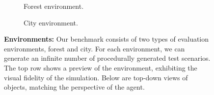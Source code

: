 \begin{figure}
    \centering
    \begin{subfigure}[b]{0.49\textwidth}
    \centering
    
    \caption{Forest environment.}
    \end{subfigure}
    \begin{subfigure}[b]{0.49\textwidth}
    \centering
    
    \caption{City environment.}
    \end{subfigure}
    \caption{\textbf{Environments:} Our benchmark consists of two types of evaluation environments, forest and city. For each environment, we can generate an infinite number of procedurally generated test scenarios. The top row shows a preview of the environment, exhibiting the visual fidelity of the simulation. Below are top-down views of objects, matching the perspective of the agent.}
    \label{fig:environments}
\end{figure}